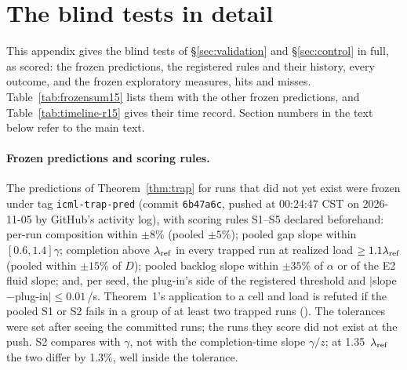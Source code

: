 \section{The blind tests in detail}\label{app:blind}

This appendix gives the blind tests of \S\ref{sec:validation} and \S\ref{sec:control} in full, as scored: the frozen
predictions, the registered rules and their history, every outcome, and the frozen exploratory measures, hits and misses.
Table~\ref{tab:frozensum15} lists them with the other frozen predictions, and Table~\ref{tab:timeline-r15} gives their time
record. Section numbers in the text below refer to the main text.

\paragraph{Frozen predictions and scoring rules.} The predictions of Theorem~\ref{thm:trap} for runs that did not yet exist were frozen under tag
\texttt{icml-trap-pred} (commit \texttt{6b47a6c}, pushed at 00:24:47 CST on 2026-11-05 by GitHub's activity log), with scoring rules
S1--S5 declared beforehand: per-run composition within $\pm8$\% (pooled $\pm5$\%); pooled gap slope within $[0.6,1.4]\gamma$; completion
above $\lambda_{\mathrm{ref}}$ in every trapped run at realized load $\ge1.1\lambda_{\mathrm{ref}}$ (pooled within $\pm15$\% of $D$); pooled backlog slope within $\pm35$\%
of $\alpha$ or of the E2 fluid slope; and, per seed, the plug-in's side of the registered threshold and
$|$slope$-$plug-in$|\le0.01$\,/s. Theorem~1's application to a cell and load is refuted if the pooled S1 or S2 fails in a group of at
least two trapped runs (). The tolerances were set after seeing the committed runs; the runs
they score did not exist at the push. S2 compares with $\gamma$, not with the completion-time slope $\gamma/z$; at 1.35~$\lambda_{\mathrm{ref}}$ the
two differ by 1.3\%, well inside the tolerance.
